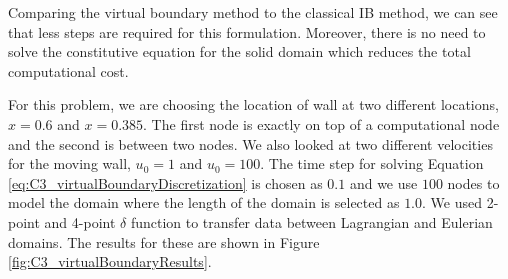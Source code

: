 Comparing the virtual boundary method to the classical IB method, we can see that less steps are required for this formulation. Moreover, there is no need to solve the constitutive equation for the solid domain which reduces the total computational cost.

For this problem, we are choosing the location of wall at two different locations, $x = 0.6$ and $x = 0.385$. The first node is exactly on top of a computational node and the second is between two nodes. We also looked at two different velocities for the moving wall, $u_0=1$ and $u_0 = 100$. The time step for solving Equation \eqref{eq:C3_virtualBoundaryDiscretization} is chosen as $0.1$ and we use $100$ nodes to model the domain where the length of the domain is selected as $1.0$. We used 2-point and 4-point $\delta$ function to transfer data between Lagrangian and Eulerian domains. The results for these are shown in Figure \ref{fig:C3_virtualBoundaryResults}.

